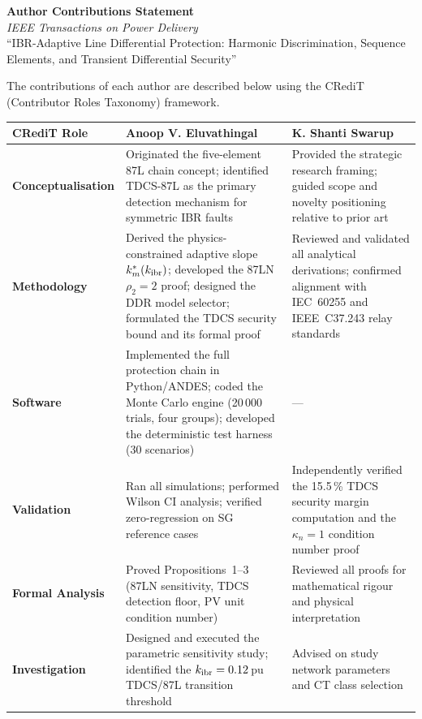 \documentclass[11pt,a4paper]{article}
\begin{document}
\begin{center}
{\large\bfseries Author Contributions Statement}\\[6pt]
\textit{IEEE Transactions on Power Delivery}\\[4pt]
``IBR-Adaptive Line Differential Protection: Harmonic Discrimination,
Sequence Elements, and Transient Differential Security''
\end{center}

\bigskip

The contributions of each author are described below using the
CRediT (Contributor Roles Taxonomy) framework.

\bigskip

\noindent\begin{tabular}{@{} >{\bfseries}p{4.2cm} p{5.0cm} p{5.0cm} @{}}
\toprule
CRediT Role &
\textbf{Anoop V. Eluvathingal} &
\textbf{K. Shanti Swarup} \\
\midrule
Conceptualisation &
Originated the five-element 87L chain concept; identified TDCS-87L as the
primary detection mechanism for symmetric IBR faults &
Provided the strategic research framing; guided scope and novelty
positioning relative to prior art \\[6pt]

Methodology &
Derived the physics-constrained adaptive slope $k_m^\ast(k_{\rm ibr})$;
developed the 87LN $\rho_2 = 2$ proof; designed the DDR model selector;
formulated the TDCS security bound and its formal proof &
Reviewed and validated all analytical derivations; confirmed alignment with
IEC~60255 and IEEE~C37.243 relay standards \\[6pt]

Software &
Implemented the full protection chain in Python/ANDES; coded the Monte Carlo
engine (20\,000 trials, four groups); developed the deterministic test harness
(30 scenarios) &
--- \\[6pt]

Validation &
Ran all simulations; performed Wilson CI analysis; verified zero-regression
on SG reference cases &
Independently verified the 15.5\,\% TDCS security margin computation and
the $\kappa_n = 1$ condition number proof \\[6pt]

Formal Analysis &
Proved Propositions~1--3 (87LN sensitivity, TDCS detection floor,
PV unit condition number) &
Reviewed all proofs for mathematical rigour and physical interpretation \\[6pt]

Investigation &
Designed and executed the parametric sensitivity study; identified the
$k_{\rm ibr} = 0.12$\,pu TDCS/87L transition threshold &
Advised on study network parameters and CT class selection \\[6pt]


\end{tabular}
\end{document}
